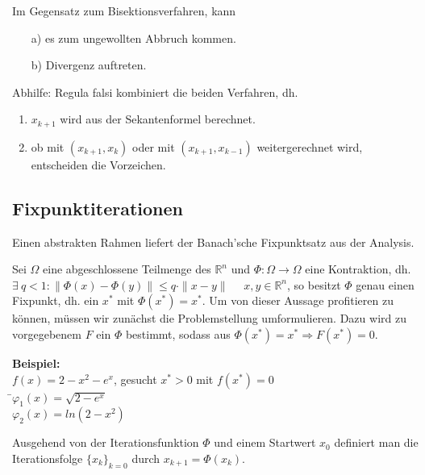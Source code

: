\begin{bemerkung}
Im Gegensatz zum Bisektionsverfahren, kann
\begin{enumerate}
\item[a)] es zum ungewollten Abbruch kommen.
\item[b)] Divergenz auftreten.
\end{enumerate}

Abhilfe: Regula falsi kombiniert die beiden Verfahren, dh.
\begin{enumerate}
\item  $x_{k+1}$ wird aus der Sekantenformel berechnet.
\item  ob mit $(x_{k+1},x_k)$ oder mit $(x_{k+1},x_{k-1})$ weitergerechnet wird, entscheiden die Vorzeichen.
\end{enumerate}
\end{bemerkung}


\subsection{Fixpunktiterationen}

Einen abstrakten Rahmen liefert der Banach'sche Fixpunktsatz aus der Analysis.
\newline

\noindent Sei $\Omega$ eine abgeschlossene Teilmenge des $\mathbb{R}^n$ und $\Phi: \Omega
\longrightarrow \Omega$ eine Kontraktion, dh. $\exists \ q<1: \| \Phi(x) -
\Phi(y)\| \leq q\cdot \|x-y\|$ \ \ $x,y \in \mathbb{R}^n$, so besitzt $\Phi$
genau einen Fixpunkt, dh. ein $x^*$ mit $\Phi(x^*)=x^*$.  Um von dieser Aussage
profitieren zu können, müssen wir zunächst die Problemstellung umformulieren.
Dazu wird zu vorgegebenem $F$ ein $\Phi$ bestimmt, sodass aus $\Phi(x^*)=x^*
\Rightarrow F(x^*)=0$.

\begin{tabbing}
\textbf{Beispiel:}
\\$f(x)=2-x^2-e^x$, gesucht $x^*>0$ mit $f(x^*)=0$\\
\hspace*{8mm} \=$\varphi_1(x)=\sqrt{2-e^x}$\\
\>$\varphi_2(x)=ln(2-x^2)$\\
\end{tabbing}

\begin{definition} [Fixpunktiteration]
Ausgehend von der Iterationsfunktion $\Phi$ und einem Startwert $x_0$ definiert
man die Iterationsfolge $\{x_k\}_{k=0}$ durch $x_{k+1}=\Phi(x_k)$.
\end{definition}

